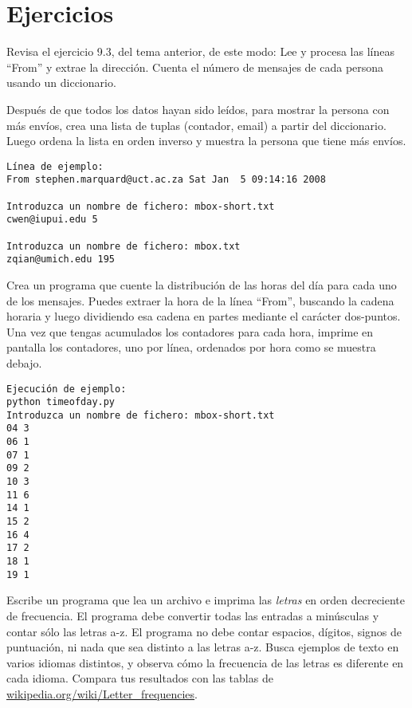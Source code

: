 \section{Ejercicios}

\begin{ex}
Revisa el ejercicio 9.3, del tema anterior, de este modo:
Lee y procesa las líneas ``From'' y extrae la
dirección. Cuenta el número de
mensajes de cada persona usando un diccionario.
	
Después de que todos los datos hayan sido leídos, para mostrar
la persona con más envíos, crea
una lista de tuplas (contador, email) a partir del
diccionario. Luego ordena la lista en orden
inverso y muestra la persona que tiene más
envíos.

\beforeverb
\begin{verbatim}
Línea de ejemplo:
From stephen.marquard@uct.ac.za Sat Jan  5 09:14:16 2008

Introduzca un nombre de fichero: mbox-short.txt
cwen@iupui.edu 5

Introduzca un nombre de fichero: mbox.txt
zqian@umich.edu 195
\end{verbatim}
\afterverb
\end{ex}
\begin{ex}
Crea un programa que cuente la distribución de las horas del día para
cada uno de los mensajes. Puedes extraer la hora de la línea
``From'', buscando la cadena horaria y luego dividiendo esa cadena
en partes mediante el carácter dos-puntos. Una vez que tengas acumulados
los contadores para cada hora, imprime en pantalla los contadores, uno por línea,
ordenados por hora como se muestra debajo.
\beforeverb
\begin{verbatim}
Ejecución de ejemplo:
python timeofday.py
Introduzca un nombre de fichero: mbox-short.txt
04 3
06 1
07 1
09 2
10 3
11 6
14 1
15 2
16 4
17 2
18 1
19 1
\end{verbatim}
\afterverb
\end{ex}


\begin{ex}
Escribe un programa que lea un archivo e
imprima las {\em letras} en orden decreciente de frecuencia. El programa
debe convertir todas las entradas a minúsculas y contar sólo las letras a-z.
El programa no debe contar espacios, dígitos, signos de puntuación, ni nada
que sea distinto a las letras a-z.
Busca ejemplos de texto en varios idiomas distintos, y observa cómo la frecuencia
de las letras es diferente en cada idioma. Compara tus resultados con las tablas de
\url{wikipedia.org/wiki/Letter_frequencies}.


\end{ex}